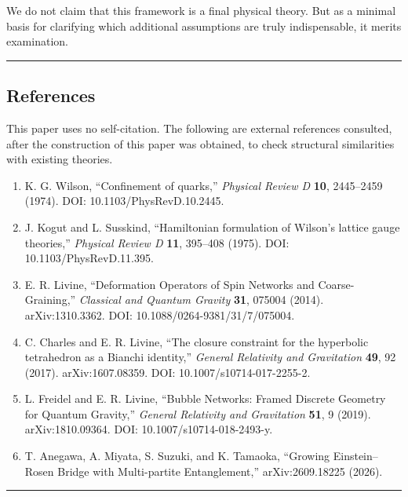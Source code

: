 \documentclass[
  a4paper,
]{article}
\providecommand{\tightlist}{%
  \setlength{\itemsep}{0pt}\setlength{\parskip}{0pt}}
\begin{document}
We do not claim that this framework is a final physical theory. But as a
minimal basis for clarifying which additional assumptions are truly
indispensable, it merits examination.

\begin{center}\rule{0.5\linewidth}{0.5pt}\end{center}

\subsection{References}\label{references}

This paper uses no self-citation. The following are external references
consulted, after the construction of this paper was obtained, to check
structural similarities with existing theories.

\begin{enumerate}
\def\labelenumi{\arabic{enumi}.}
\tightlist
\item
  K. G. Wilson, ``Confinement of quarks,'' \emph{Physical Review D}
  \textbf{10}, 2445--2459 (1974). DOI: 10.1103/PhysRevD.10.2445.
\item
  J. Kogut and L. Susskind, ``Hamiltonian formulation of Wilson's
  lattice gauge theories,'' \emph{Physical Review D} \textbf{11},
  395--408 (1975). DOI: 10.1103/PhysRevD.11.395.
\item
  E. R. Livine, ``Deformation Operators of Spin Networks and
  Coarse-Graining,'' \emph{Classical and Quantum Gravity} \textbf{31},
  075004 (2014). arXiv:1310.3362. DOI: 10.1088/0264-9381/31/7/075004.
\item
  C. Charles and E. R. Livine, ``The closure constraint for the
  hyperbolic tetrahedron as a Bianchi identity,'' \emph{General
  Relativity and Gravitation} \textbf{49}, 92 (2017). arXiv:1607.08359.
  DOI: 10.1007/s10714-017-2255-2.
\item
  L. Freidel and E. R. Livine, ``Bubble Networks: Framed Discrete
  Geometry for Quantum Gravity,'' \emph{General Relativity and
  Gravitation} \textbf{51}, 9 (2019). arXiv:1810.09364. DOI:
  10.1007/s10714-018-2493-y.
\item
  T. Anegawa, A. Miyata, S. Suzuki, and K. Tamaoka, ``Growing
  Einstein--Rosen Bridge with Multi-partite Entanglement,''
  arXiv:2609.18225 (2026).
\end{enumerate}

\begin{center}\rule{0.5\linewidth}{0.5pt}\end{center}
\end{document}
